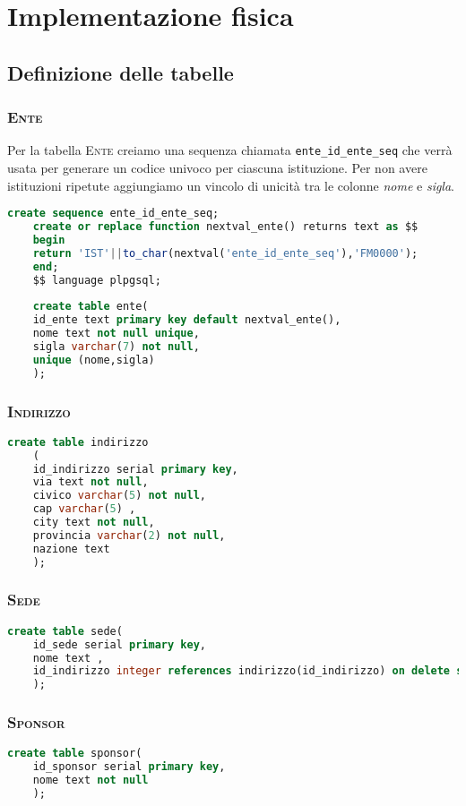 \chapter{Implementazione fisica}

\section{Definizione delle tabelle}
\subsection{\textsc{Ente}}
Per la tabella \textsc{Ente} creiamo una sequenza chiamata \texttt{ente\_id\_ente\_seq} che verrà usata per generare un codice univoco per ciascuna istituzione. Per non avere istituzioni ripetute aggiungiamo un vincolo di unicità tra le colonne \textit{nome} e \textit{sigla}.
\begin{lstlisting}[language=SQL,style=mystyle]
	create sequence ente_id_ente_seq;
	create or replace function nextval_ente() returns text as $$
	begin
	return 'IST'||to_char(nextval('ente_id_ente_seq'),'FM0000');
	end;
	$$ language plpgsql;
	
	create table ente(
	id_ente text primary key default nextval_ente(),
	nome text not null unique,
	sigla varchar(7) not null,
	unique (nome,sigla)
	);
\end{lstlisting}
\subsection{\textsc{Indirizzo}}
\begin{lstlisting}[language=SQL,style=mystyle]
	create table indirizzo
	(
	id_indirizzo serial primary key,
	via text not null,
	civico varchar(5) not null,
	cap varchar(5) ,
	city text not null,
	provincia varchar(2) not null,
	nazione text
	);
\end{lstlisting}
\subsection{\textsc{Sede}}
\begin{lstlisting}[language=SQL,style=mystyle]
	create table sede(
	id_sede serial primary key,
	nome text ,
	id_indirizzo integer references indirizzo(id_indirizzo) on delete set null
	);
\end{lstlisting}
\subsection{\textsc{Sponsor}}
\begin{lstlisting}[language=SQL,style=mystyle]
	create table sponsor(
	id_sponsor serial primary key,
	nome text not null
	);
\end{lstlisting}

